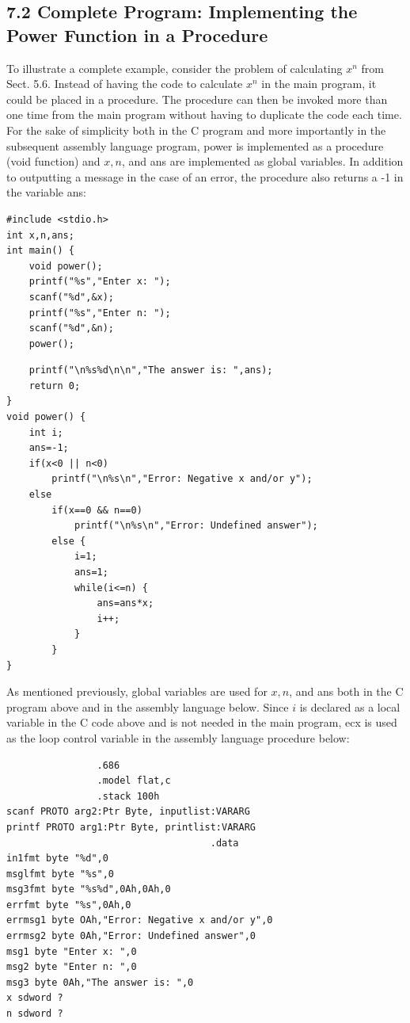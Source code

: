 \documentclass[10pt]{book}
\begin{document}
\subsection*{7.2 Complete Program: Implementing the Power Function in a Procedure}
To illustrate a complete example, consider the problem of calculating $x^{n}$ from Sect. 5.6. Instead of having the code to calculate $x^{n}$ in the main program, it could be placed in a procedure. The procedure can then be invoked more than one time from the main program without having to duplicate the code each time. For the sake of simplicity both in the C program and more importantly in the subsequent assembly language program, power is implemented as a procedure (void function) and $x, n$, and ans are implemented as global variables. In addition to outputting a message in the case of an error, the procedure also returns a -1 in the variable ans:

\begin{verbatim}
#include <stdio.h>
int x,n,ans;
int main() {
    void power();
    printf("%s","Enter x: ");
    scanf("%d",&x);
    printf("%s","Enter n: ");
    scanf("%d",&n);
    power();
\end{verbatim}

\begin{verbatim}
    printf("\n%s%d\n\n","The answer is: ",ans);
    return 0;
}
void power() {
    int i;
    ans=-1;
    if(x<0 || n<0)
        printf("\n%s\n","Error: Negative x and/or y");
    else
        if(x==0 && n==0)
            printf("\n%s\n","Error: Undefined answer");
        else {
            i=1;
            ans=1;
            while(i<=n) {
                ans=ans*x;
                i++;
            }
        }
}
\end{verbatim}

As mentioned previously, global variables are used for $x, n$, and ans both in the C program above and in the assembly language below. Since $i$ is declared as a local variable in the C code above and is not needed in the main program, ecx is used as the loop control variable in the assembly language procedure below:

\begin{verbatim}
                .686
                .model flat,c
                .stack 100h
scanf PROTO arg2:Ptr Byte, inputlist:VARARG
printf PROTO arg1:Ptr Byte, printlist:VARARG
                                    .data
in1fmt byte "%d",0
msglfmt byte "%s",0
msg3fmt byte "%s%d",0Ah,0Ah,0
errfmt byte "%s",0Ah,0
errmsg1 byte OAh,"Error: Negative x and/or y",0
errmsg2 byte 0Ah,"Error: Undefined answer",0
msg1 byte "Enter x: ",0
msg2 byte "Enter n: ",0
msg3 byte 0Ah,"The answer is: ",0
x sdword ?
n sdword ?
\end{verbatim}
\end{document}
